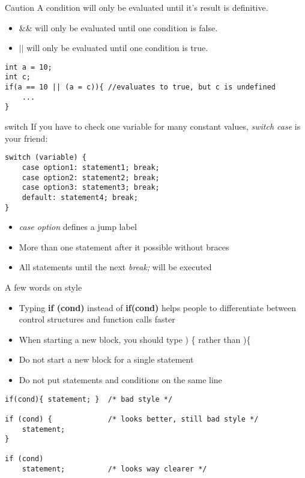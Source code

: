 \begin{frame}[fragile]{Caution}
	A condition will only be evaluated until it's result is definitive.
	\begin{itemize}
	\item \&\& will only be evaluated until one condition is false.
	\item $||$ will only be evaluated until one condition is true.
	\end{itemize}
	\begin{lstlisting}[numbers=none]
int a = 10;
int c;
if(a == 10 || (a = c)){ //evaluates to true, but c is undefined
	...	
}
\end{lstlisting} 
\end{frame}
\begin{frame}[fragile]{switch}
	If you have to check one variable for many constant values, \textit{switch case} is your friend:
	\begin{lstlisting}[numbers=none,basicstyle=\itshape\footnotesize]
switch (variable) {
	case option1: statement1; break;
	case option2: statement2; break;
	case option3: statement3; break;
	default: statement4; break;
}
\end{lstlisting}
	\begin{itemize}
	\item \textit{case option} defines a jump label
	\item More than one statement after it possible without braces
	\item All statements until the next \textit{break;} will be executed
\end{itemize}	 
\end{frame}
\begin{frame}[fragile]{A few words on style}

	\begin{itemize}
		\item Typing \textbf{if (cond)} instead of \textbf{if(cond)} helps people to differentiate between control structures and function calls faster
		\item When starting a new block, you should type ) \{ rather than )\{
		\item Do not start a new block for a single statement
		\item Do not put statements and conditions on the same line
	\end{itemize}
	\begin{lstlisting}[numbers=none]
if(cond){ statement; }	/* bad style */

if (cond) {				/* looks better, still bad style */
	statement;
}

if (cond)
	statement;			/* looks way clearer */
\end{lstlisting}
\end{frame}
